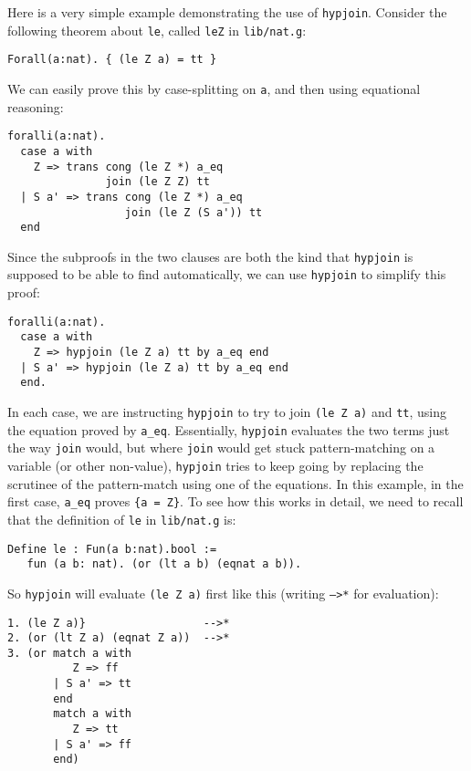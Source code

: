 \documentclass{book}[12pt]
\begin{document}
Here is a very simple example demonstrating the use of \texttt{hypjoin}.
Consider the following theorem about \texttt{le}, called \texttt{leZ} in
\texttt{lib/nat.g}:

\begin{verbatim}
Forall(a:nat). { (le Z a) = tt }
\end{verbatim}

\noindent We can easily prove this by case-splitting on \texttt{a}, and then
using equational reasoning:

\begin{verbatim}
foralli(a:nat). 
  case a with
    Z => trans cong (le Z *) a_eq
               join (le Z Z) tt
  | S a' => trans cong (le Z *) a_eq
                  join (le Z (S a')) tt
  end
\end{verbatim}

\noindent Since the subproofs in the two clauses are both the kind
that \texttt{hypjoin} is supposed to be able to find automatically, we
can use \texttt{hypjoin} to simplify this proof:

\begin{verbatim}
foralli(a:nat). 
  case a with
    Z => hypjoin (le Z a) tt by a_eq end
  | S a' => hypjoin (le Z a) tt by a_eq end
  end.
\end{verbatim}

\noindent In each case, we are instructing \texttt{hypjoin} to try to
join \texttt{(le Z a)} and \texttt{tt}, using the equation proved by
\texttt{a\_eq}.  Essentially, \texttt{hypjoin} evaluates the two terms
just the way \texttt{join} would, but where \texttt{join} would get
stuck pattern-matching on a variable (or other non-value),
\texttt{hypjoin} tries to keep going by replacing the scrutinee of the
pattern-match using one of the equations.  In this example, in the
first case, \texttt{a\_eq} proves \texttt{\{a = Z\}}.  To see how this
works in detail, we need to recall that the definition of \texttt{le} in
\texttt{lib/nat.g} is:

\begin{verbatim}
Define le : Fun(a b:nat).bool :=
   fun (a b: nat). (or (lt a b) (eqnat a b)).
\end{verbatim}

\noindent So \texttt{hypjoin} will evaluate \texttt{(le Z a)} first
like this (writing \texttt{-->*} for evaluation):

\begin{verbatim}
1. (le Z a)}                  -->* 
2. (or (lt Z a) (eqnat Z a))  -->*
3. (or match a with
          Z => ff
       | S a' => tt
       end
       match a with
          Z => tt
       | S a' => ff
       end)                  
\end{verbatim}
          
\end{document}
